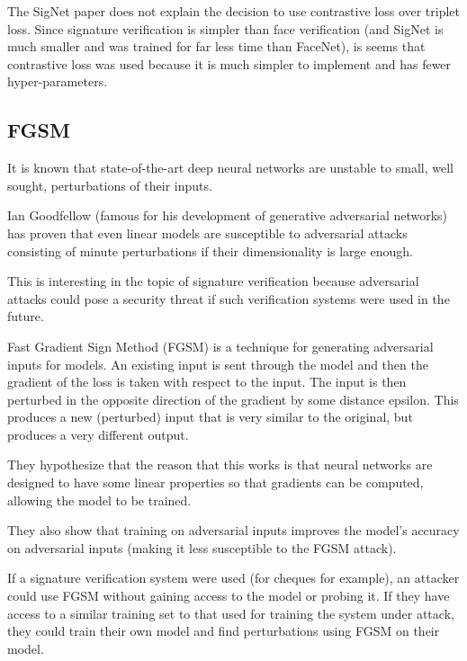 The SigNet paper does not explain the decision to use contrastive loss over triplet loss.
Since signature verification is simpler than face verification (and SigNet is much smaller and was trained for far less time than FaceNet), is seems that contrastive loss was used because it is much simpler to implement and has fewer hyper-parameters\cite{sig_net}\cite{face_net}.


\subsection{FGSM}\label{sec:fgsm}

It is known that state-of-the-art deep neural networks are unstable to small, well sought, perturbations of their inputs\cite{deep_fool}.

Ian Goodfellow (famous for his development of generative adversarial networks) has proven that even linear models are susceptible to adversarial attacks consisting of minute perturbations if their dimensionality is large enough\cite{goodfellow}.

This is interesting in the topic of signature verification because adversarial attacks could pose a security threat if such verification systems were used in the future.

Fast Gradient Sign Method (FGSM) is a technique for generating adversarial inputs for models\cite{goodfellow}.
An existing input is sent through the model and then the gradient of the loss is taken with respect to the input.
The input is then perturbed in the opposite direction of the gradient by some distance epsilon.
This produces a new (perturbed) input that is very similar to the original, but produces a very different output.

They hypothesize that the reason that this works is that neural networks are designed to have some linear properties so that gradients can be computed, allowing the model to be trained\cite{goodfellow}. 

They also show that training on adversarial inputs improves the model's accuracy on adversarial inputs (making it less susceptible to the FGSM attack).

If a signature verification system were used (for cheques for example), an attacker could use FGSM without gaining access to the model or probing it.
If they have access to a similar training set to that used for training the system under attack, they could train their own model and find perturbations using FGSM on their model.

